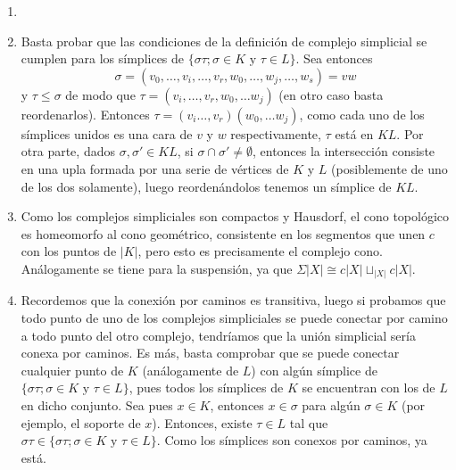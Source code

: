 \documentclass[twoside]{article}
\begin{document}
\begin{solucion}
\begin{enumerate}
\item[]
\item Basta probar que las condiciones de la definición de complejo simplicial se cumplen para los símplices de $\{στ; σ \in K \text{ y }τ \in L\}$. Sea entonces $$\sigma=(v_0,\dots,v_i,\dots, v_r, w_0,\dots,w_j,\dots, w_s)=vw$$ y $\tau\leq\sigma$ de modo que $\tau=(v_i,\dots, v_r,w_0,\dots w_j)$ (en otro caso basta reordenarlos). Entonces $\tau=(v_i\dots, v_r)(w_0,\dots w_j)$, como cada uno de los símplices unidos es una cara de $v$ y $w$ respectivamente, $\tau$ está en $KL$. Por otra parte, dados $\sigma,\sigma'\in KL$, si $\sigma\cap\sigma'\neq\emptyset$, entonces la intersección consiste en una upla formada por una serie de vértices de $K$ y $L$ (posiblemente de uno de los dos solamente), luego reordenándolos tenemos un símplice de $KL$.

\item Como los complejos simpliciales son compactos y Hausdorf, el cono topológico es homeomorfo al cono geométrico, consistente en los segmentos que unen $c$ con los puntos de $|K|$, pero esto es precisamente el complejo cono. Análogamente se tiene para la suspensión, ya que $\Sigma |X|\cong c|X|\sqcup_{|X|} c|X|$.

\item Recordemos que la conexión por caminos es transitiva, luego si probamos que todo punto de uno de los complejos simpliciales se puede conectar por camino a todo punto del otro complejo, tendríamos que la unión simplicial sería conexa por caminos.
Es más, basta comprobar que se puede conectar cualquier punto de $K$ (análogamente de $L$) con algún símplice de $\{στ; σ \in K \text{ y }τ \in L\}$, pues todos los símplices de $K$ se encuentran con los de $L$ en dicho conjunto.
Sea pues $x\in K$, entonces $x\in\sigma$ para algún $\sigma\in K$ (por ejemplo, el soporte de $x$).
Entonces, existe $\tau\in L$ tal que $\sigma\tau\in\{στ; σ \in K \text{ y }τ \in L\}$.
Como los símplices son conexos por caminos, ya está.

\end{enumerate}
\end{solucion}
\end{document}

